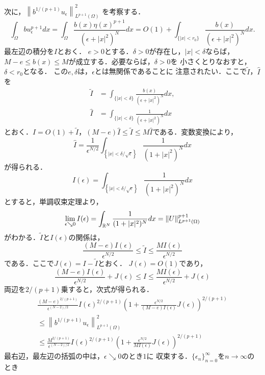 次に，$\left\| b^{1/(p+1)} u_\epsilon \right\|_{L^{p+1}(\Omega)}^2$
を考察する．
\[
 \int_\Omega b u_{\epsilon}^{p+1} dx
 = \int_\Omega \frac{b(x) \eta(x)^{p+1}}{(\epsilon + \lvert x
 \rvert^2)^N} dx 
 = O(1) + \int_{ \{ \lvert x \rvert < r_0 \} } 
 \frac{b(x)}{(\epsilon + \lvert x
 \rvert^2)^N} dx.
\]
最左辺の積分を$I$とおく．
$e > 0$とする．$\delta > 0$が存在し，$\lvert x \rvert < \delta$ならば，
$M - e \leq b(x) \leq M$が成立する．必要ならば，$\delta > 0$を
小さくとりなおすと，$\delta < r_0$となる．
この$e, \delta$は，$\epsilon$とは無関係であることに
注意されたい．ここで$\tilde{I}$，$\hat{I}$を
\begin{align*}
 \tilde{I} &= \int_{ \{ \lvert x \rvert < \delta \} } 
 \frac{b(x)}{(\epsilon + \lvert x
 \rvert^2)^N} dx, \\
 \hat{I} &= \int_{ \{ \lvert x \rvert < \delta \} } 
 \frac{1}{(\epsilon + \lvert x
 \rvert^2)^N} dx
\end{align*}
とおく．$I = O(1) + \tilde{I}$，$(M - e) \hat{I}
 \leq \tilde{I} \leq M \hat{I}$である．変数変換により，
\[
 \hat{I} 
 = \frac{1}{\epsilon^{N/2}} \int_{ \left\{ \lvert x \rvert <
 \delta/\sqrt{\epsilon} \right\}} \frac{1}{(1 + \lvert x
 \rvert^2)^N}dx
\]
が得られる．
\[
 I(\epsilon) = \int_{ \left\{ \lvert x \rvert <
 \delta/\sqrt{\epsilon} \right\}} \frac{1}{(1 + \lvert x
 \rvert^2)^N} dx
\]
とすると，単調収束定理より，
\[
 \lim_{\epsilon \searrow 0} I(\epsilon) =
 \int_{\mathbb{R}^N} \frac{1}{(1 + \lvert x
 \rvert^2)^N} dx = \left\| U \right\|_{L^{p+1}(\Omega)}^{p+1}
\]
がわかる．$\tilde{I}$と$I(\epsilon)$の関係は，
\[
 \frac{(M - e)I(\epsilon)}{\epsilon^{N/2}} \leq \tilde{I} \leq \frac{M
 I(\epsilon)}{\epsilon^{N/2}}
\]
である．ここで$J(\epsilon) = I - \tilde{I}$とおく．
$J(\epsilon) = O(1)$であり，
\[
 \frac{(M - e)I(\epsilon)}{\epsilon^{N/2}} + J(\epsilon)
 \leq I \leq \frac{M
 I(\epsilon)}{\epsilon^{N/2}} + J(\epsilon)
\]
両辺を$2/(p+1)$乗すると，次式が得られる．
\begin{multline}
 \frac{(M -e)^{2/(p+1)}}{\epsilon^{(N-2)/2}} I(\epsilon)^{2/(p+1)}
 \left( 1 + \frac{\epsilon^{N/2}}{(M-e)I(\epsilon)} J(\epsilon)
 \right)^{2/(p+1)}  \\  \leq  \left\| b^{1/(p+1)} u_\epsilon
 \right\|^2_{L^{p+1}(\Omega)}  \\ \leq
 \frac{M^{2/(p+1)}}{\epsilon^{(N-2)/2}} I(\epsilon)^{2/(p+1)}
 \left( 1 + \frac{\epsilon^{N/2}}{MI(\epsilon)} J(\epsilon)
 \right)^{2/(p+1)} \label{eq:2/p+1pow} 
\end{multline}
最右辺，最左辺の括弧の中は，$\epsilon \searrow 0$のとき$1$に
収束する．$\{ \epsilon_n \}_{n=0}^\infty$を$n \to \infty$のとき
